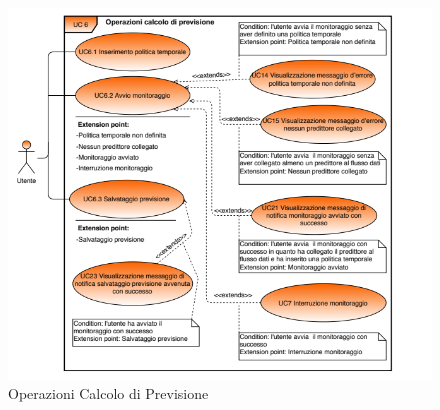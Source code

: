 	\begin{figure}[H]
		\centering
		\includegraphics[scale=0.70]{../Analisi_dei_requisiti/img/Diagrammi_UML/UC6_Operazioni_Calcolo_di_Previsione.png}
		\caption{Operazioni Calcolo di Previsione}
	\end{figure}	

